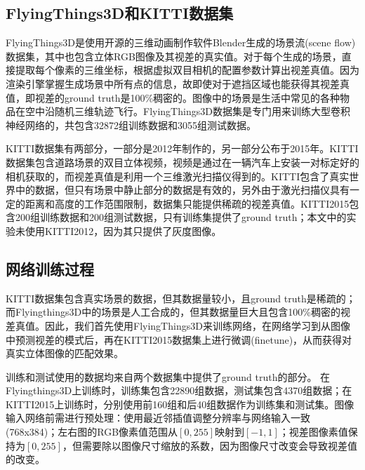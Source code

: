 \subsection{FlyingThings3D和KITTI数据集}
FlyingThings3D\cite{mayer2016large}是使用开源的三维动画制作软件Blender生成的场景流(scene flow)数据集，其中也包含立体RGB图像及其视差的真实值。对于每个生成的场景，直接提取每个像素的三维坐标，根据虚拟双目相机的配置参数计算出视差真值。因为渲染引擎掌握生成场景中所有点的信息，故即使对于遮挡区域也能获得其视差真值，即视差的ground truth是100\%稠密的。图像中的场景是生活中常见的各种物品在空中沿随机三维轨迹飞行。FlyingThings3D数据集是专门用来训练大型卷积神经网络的，共包含32872组训练数据和3055组测试数据。

KITTI数据集有两部分，一部分是2012年制作的\cite{Geiger2012}，另一部分公布于2015年\cite{Menze_2015_CVPR}。KITTI数据集包含道路场景的双目立体视频，视频是通过在一辆汽车上安装一对标定好的相机获取的，而视差真值是利用一个三维激光扫描仪得到的。KITTI包含了真实世界中的数据，但只有场景中静止部分的数据是有效的，另外由于激光扫描仪具有一定的距离和高度的工作范围限制，数据集只能提供稀疏的视差真值。KITTI2015包含200组训练数据和200组测试数据，只有训练集提供了ground truth；本文中的实验未使用KITTI2012，因为其只提供了灰度图像。


\subsection{网络训练过程}
KITTI数据集包含真实场景的数据，但其数据量较小，且ground truth是稀疏的；而Flyingthings3D中的场景是人工合成的，但其数据量巨大且包含100\%稠密的视差真值。因此，我们首先使用FlyingThings3D来训练网络，在网络学习到从图像中预测视差的模式后，再在KITTI2015数据集上进行微调(finetune)，从而获得对真实立体图像的匹配效果。

训练和测试使用的数据均来自两个数据集中提供了ground truth的部分。
在Flyingthings3D上训练时，训练集包含22890组数据，测试集包含4370组数据；在KITTI2015上训练时，分别使用前160组和后40组数据作为训练集和测试集。图像输入网络前需进行预处理：使用最近邻插值调整分辨率与网络输入一致(768x384)；左右图的RGB像素值范围从$[0, 255]$映射到$[-1, 1]$；视差图像素值保持为$[0, 255]$，但需要除以图像尺寸缩放的系数，因为图像尺寸改变会导致视差值的改变。

